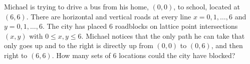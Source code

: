 Michael is trying to drive a bus from his home, $(0,0)$,  to school, located at $(6,6)$. There are horizontal and vertical roads at every line $x=0,1,\ldots,6$ and $y=0,1,\ldots,6$. The city has placed $6$ roadblocks on lattice point intersections $(x,y)$ with $0\leq x,y \leq 6$. Michael notices that the only path he can take that only goes up and to the right is directly up from $(0,0)$ to $(0,6)$,  and then right to $(6,6)$. How many sets of $6$ locations could the city have blocked?
